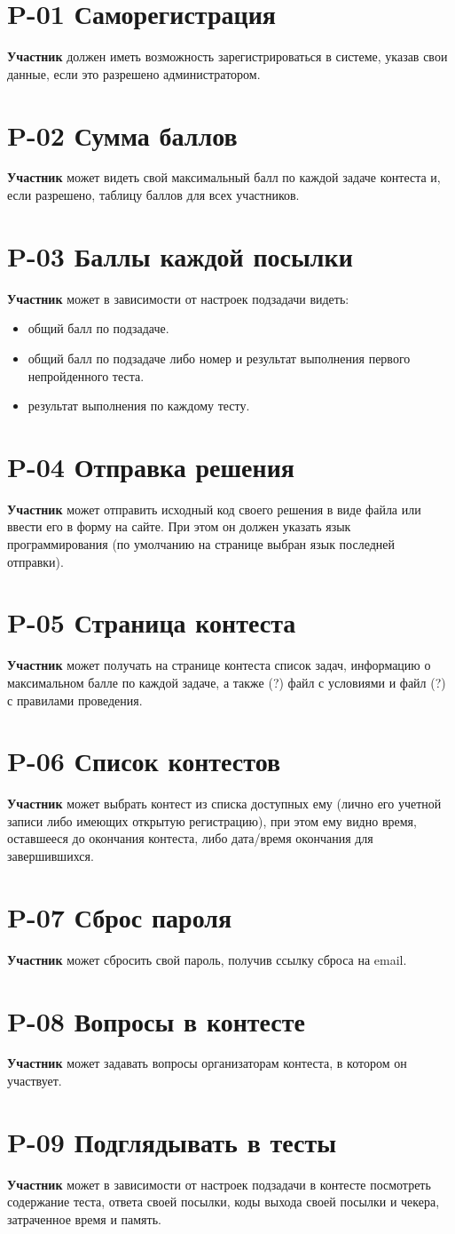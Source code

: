 \documentclass{book}
\newcommand{\newcard}[1]{\newpage \section*{#1}}
\begin{document}
\section*{P-01 Саморегистрация}
\textbf{Участник} должен иметь возможность зарегистрироваться в системе, указав свои данные, если это разрешено администратором.


\newcard{P-02 Сумма баллов}
\textbf{Участник} может видеть свой максимальный балл по каждой задаче контеста и, если разрешено, таблицу баллов для всех участников.


\newcard{P-03 Баллы каждой посылки}
\textbf{Участник} может в зависимости от настроек подзадачи видеть:
\begin{itemize}\setlength{\itemsep}{0pt}
\item общий балл по подзадаче.
\item общий балл по подзадаче либо номер и результат выполнения первого непройденного теста.
\item результат выполнения по каждому тесту.
\end{itemize}


\newcard{P-04 Отправка решения}
\textbf{Участник} может отправить исходный код своего решения в виде файла или ввести его в форму на сайте. При этом он должен указать язык программирования (по умолчанию на странице выбран язык последней отправки).


\newcard{P-05 Страница контеста }
\textbf{Участник} может получать на странице контеста список задач, информацию о максимальном балле по каждой задаче, а также (?) файл с условиями и файл (?) с правилами проведения.


\newcard{P-06 Список контестов }
\textbf{Участник} может выбрать контест из списка доступных ему (лично его учетной записи либо имеющих открытую регистрацию), при этом ему видно время, оставшееся до окончания контеста, либо дата/время окончания для завершившихся.


\newcard{P-07 Сброс пароля}
\textbf{Участник} может сбросить свой пароль, получив ссылку сброса на email.


\newcard{P-08 Вопросы в контесте}
\textbf{Участник} может задавать вопросы организаторам контеста, в котором он участвует.


\newcard{P-09 Подглядывать в тесты}
\textbf{Участник} может в зависимости от настроек подзадачи в контесте посмотреть содержание теста, ответа своей посылки, коды выхода своей посылки и чекера, затраченное время и память.

\end{document}
